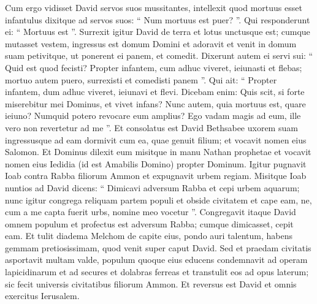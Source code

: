 \begin{biblechapter}
\begin{biblechapter}
\begin{biblechapter}
\begin{biblechapter}
\begin{biblechapter}
\begin{biblechapter}
\begin{biblechapter}
\begin{biblechapter}
\begin{biblechapter}
\begin{biblechapter}
\begin{biblechapter}
\begin{biblechapter}
\verse Cum ergo vidisset David servos suos mussitantes, intellexit quod mortuus esset infantulus dixitque ad servos suos: “ Num mortuus est puer? ”. Qui responderunt ei: “ Mortuus est ”.
 \verse Surrexit igitur David de terra et lotus unctusque est; cumque mutasset vestem, ingressus est domum Domini et adoravit et venit in domum suam petivitque, ut ponerent ei panem, et comedit. 
\verse Dixerunt autem ei servi sui: “ Quid est quod fecisti? Propter infantem, cum adhuc viveret, ieiunasti et flebas; mortuo autem puero, surrexisti et comedisti panem ”. 
\verse Qui ait: “ Propter infantem, dum adhuc viveret, ieiunavi et flevi. Dicebam enim: Quis scit, si forte miserebitur mei Dominus, et vivet infans? 
\verse Nunc autem, quia mortuus est, quare ieiuno? Numquid potero revocare eum amplius? Ego vadam magis ad eum, ille vero non revertetur ad me ”.
 \verse Et consolatus est David Bethsabee uxorem suam ingressusque ad eam dormivit cum ea, quae genuit filium; et vocavit nomen eius Salomon. Et Dominus dilexit eum 
\verse misitque in manu Nathan prophetae et vocavit nomen eius Iedidia (id est Amabilis Domino) propter Dominum.
 \verse Igitur pugnavit Ioab contra Rabba filiorum Ammon et expugnavit urbem regiam. 
\verse Misitque Ioab nuntios ad David dicens: “ Dimicavi adversum Rabba et cepi urbem aquarum; 
\verse nunc igitur congrega reliquam partem populi et obside civitatem et cape eam, ne, cum a me capta fuerit urbs, nomine meo vocetur ”. 
\verse Congregavit itaque David omnem populum et profectus est adversum Rabba; cumque dimicasset, cepit eam. 
\verse Et tulit diadema Melchom de capite eius, pondo auri talentum, habens gemmam pretiosissimam, quod venit super caput David. Sed et praedam civitatis asportavit multam valde, 
\verse populum quoque eius educens condemnavit ad operam lapicidinarum et ad secures et dolabras ferreas et transtulit eos ad opus laterum; sic fecit universis civitatibus filiorum Ammon. Et reversus est David et omnis exercitus Ierusalem.
 

\end{biblechapter}
\end{biblechapter}
\end{biblechapter}
\end{biblechapter}
\end{biblechapter}
\end{biblechapter}
\end{biblechapter}
\end{biblechapter}
\end{biblechapter}
\end{biblechapter}
\end{biblechapter}
\end{biblechapter}
